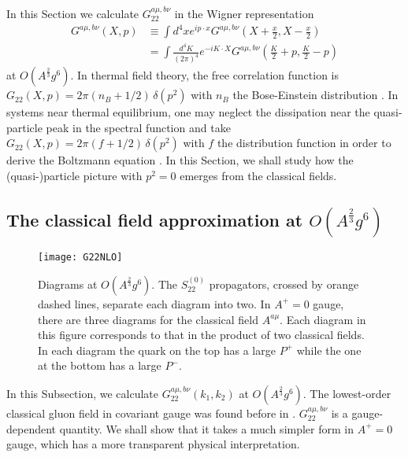 \documentclass[onecolumn,showpacs,nobibnotes,nofootinbib,12pt,aps,prd,showpacs,notitlepage,nofootinbib,preprintnumbers,amsmath,amssymb]{article}
\begin{document}
In this Section we calculate $G_{22}^{a\mu,b\nu}$ in the Wigner
representation
\begin{align}\label{eq:Gxp}
  G^{a\mu,b\nu}(X,p)&\equiv\int d^4x e^{ip\cdot x} G^{a\mu,b\nu}\left(X+\frac{x}{2},X-\frac{x}{2}\right)\nonumber\\
  &=\int\frac{d^4K}{(2\pi)^4} e^{-iK\cdot X}
  G^{a\mu,b\nu}\left(\frac{K}{2}+p,\frac{K}{2}-p\right)
\end{align}
at $O(A^{\frac{2}{3}} g^6)$. In thermal field theory, the free
correlation function is $G_{22}(X,p)=2\pi(n_B+1/2) \, \delta(p^2)$
with $n_B$ the Bose-Einstein distribution \cite{Niemi:1983nf}. In
systems near thermal equilibrium, one may neglect the dissipation near
the quasi-particle peak in the spectral function and take
$G_{22}(X,p)=2\pi(f+1/2) \, \delta(p^2)$ with $f$ the distribution
function in order to derive the Boltzmann equation
\cite{Chou:1984es,Calzetta:1986cq, Arnold:2002zm}. In this Section, we
shall study how the (quasi-)particle picture with $p^2=0$ emerges from
the classical fields.


\subsection{The classical field approximation at $O(A^{\frac{2}{3}}  g^6)$}

\begin{figure}[tbp]
\begin{center}
\texttt{[image: G22NLO]}
\end{center}
\caption[*]{Diagrams at $O(A^{\frac{2}{3}}g^6)$. The $S^{(0)}_{22}$
  propagators, crossed by orange dashed lines, separate each diagram
  into two. In $A^+=0$ gauge, there are three diagrams for the
  classical field $A^{a\mu}$. Each diagram in this figure corresponds
  to that in the product of two classical fields. In each diagram the
  quark on the top has a large $P^+$ while the one at the bottom has a
  large $P^-$.}
\label{fig:g22nlo}
\end{figure}

In this Subsection, we calculate $G_{22}^{a\mu,b\nu} (k_1, k_2)$ at
$O(A^\frac{2}{3} g^6)$. The lowest-order classical gluon field in
covariant gauge was found before in
\cite{Kovchegov:1997ke,Kovchegov:2005ss}. $G_{22}^{a\mu,b\nu}$ is a
gauge-dependent quantity. We shall show that it takes a much simpler
form in $A^+=0$ gauge, which has a more transparent physical
interpretation.
\end{document}
